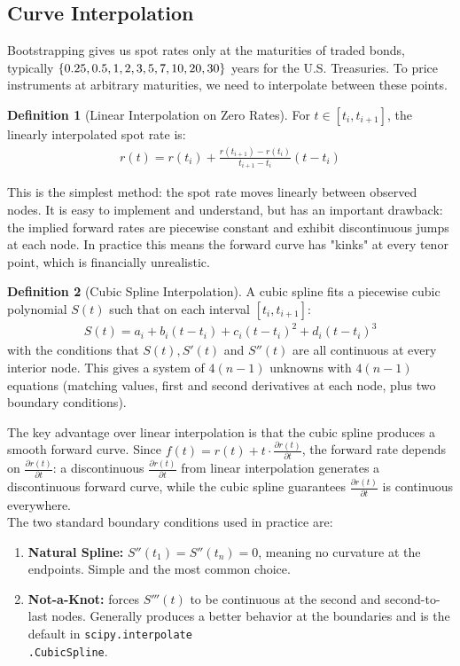 \documentclass{article}
\theoremstyle{definition}  %
\newtheorem{definition}{Definition}[section]
\theoremstyle{plain}  %
\numberwithin{definition}{section}
\numberwithin{proposition}{section}
\numberwithin{theorem}{section}
\numberwithin{equation}{section}
\begin{document}
\subsection{Curve Interpolation}

Bootstrapping gives us spot rates only at the maturities of traded bonds, typically $\{0.25, 0.5, 1, 2, 3, 5,\\
7, 10, 20, 30\}$ years for the U.S. Treasuries. To price instruments at arbitrary maturities, we need to interpolate between these points.

\begin{definition}[Linear Interpolation on Zero Rates]
    For $t \in [t_{i}, t_{i + 1}]$, the linearly interpolated spot rate is:
    \begin{align*}
        r(t) = r(t_{i}) + \frac{r(t_{i + 1}) - r(t_{i})}{t_{i + 1} - t_{i}} (t - t_{i})
    \end{align*}
\end{definition}
This is the simplest method: the spot rate moves linearly between observed nodes. It is easy to implement and understand, but has an important drawback: the implied forward rates are piecewise constant and exhibit discontinuous jumps at each node. In practice this means the forward curve has "kinks" at every tenor point, which is financially unrealistic.

\begin{definition}[Cubic Spline Interpolation]
    A cubic spline fits a piecewise cubic polynomial $S(t)$ such that on each interval $[t_{i}, t_{i + 1}]$:
    \begin{align*}
        S(t) = a_{i} + b_{i} (t - t_{i}) + c_{i} (t - t_{i})^{2} + d_{i} (t - t_{i})^{3}
    \end{align*}
    with the conditions that $S(t), S'(t)$ and $ S''(t)$ are all continuous at every interior node. This gives a system of $4(n - 1)$ unknowns with $4(n - 1)$ equations (matching values, first and second derivatives at each node, plus two boundary conditions).
\end{definition}

The key advantage over linear interpolation is that the cubic spline produces a smooth forward curve. Since $f(t) = r(t) + t \cdot \frac{\partial r(t)}{\partial t}$, the forward rate depends on $\frac{\partial r(t)}{\partial t}$: a discontinuous $\frac{\partial r(t)}{\partial t}$ from linear interpolation generates a discontinuous forward curve, while the cubic spline guarantees $\frac{\partial r(t)}{\partial t}$ is continuous everywhere. \\
The two standard boundary conditions used in practice are:
\begin{enumerate}
    \item \textbf{Natural Spline:} $S''(t_{1}) = S''(t_{n}) = 0$, meaning no curvature at the endpoints. Simple and the most common choice.
    \item \textbf{Not-a-Knot:} forces $S'''(t)$ to be continuous at the second and second-to-last nodes. Generally produces a better behavior at the boundaries and is the default in \texttt{scipy.interpolate\\.CubicSpline}.
\end{enumerate}
\end{document}
